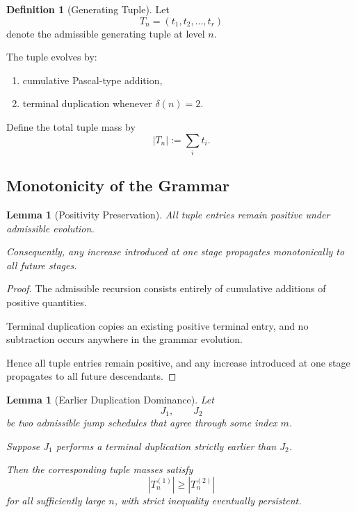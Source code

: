 \documentclass[12pt, oneside]{article}
\numberwithin{equation}{section}
\theoremstyle{definition}
\newtheorem{definition}{Definition}[section]
\theoremstyle{plain}
\newtheorem{lemma}[theorem]{Lemma}
\theoremstyle{remark}
\begin{document}

\begin{definition}[Generating Tuple]
Let
\[
T_n=(t_1,t_2,\dots,t_r)
\]
denote the admissible generating tuple at level $n$.

The tuple evolves by:
\begin{enumerate}
\item cumulative Pascal-type addition,
\item terminal duplication whenever $\delta(n)=2$.
\end{enumerate}

Define the total tuple mass by
\[
|T_n|:=\sum_i t_i.
\]
\end{definition}


\subsection{Monotonicity of the Grammar}


\begin{lemma}[Positivity Preservation]
\label{lem:positivity}
All tuple entries remain positive under admissible evolution.

Consequently, any increase introduced at one stage propagates
monotonically to all future stages.
\end{lemma}

\begin{proof}
The admissible recursion consists entirely of cumulative additions
of positive quantities.

Terminal duplication copies an existing positive terminal entry,
and no subtraction occurs anywhere in the grammar evolution.

Hence all tuple entries remain positive, and any increase introduced
at one stage propagates to all future descendants.
\end{proof}


\begin{lemma}[Earlier Duplication Dominance]
\label{lem:earlier-duplication}
Let
\[
J_1,\qquad J_2
\]
be two admissible jump schedules that agree through some index $m$.

Suppose $J_1$ performs a terminal duplication strictly earlier than
$J_2$.

Then the corresponding tuple masses satisfy
\[
|T_n^{(1)}|
\ge
|T_n^{(2)}|
\]
for all sufficiently large $n$, with strict inequality eventually
persistent.
\end{lemma}
\end{document}
